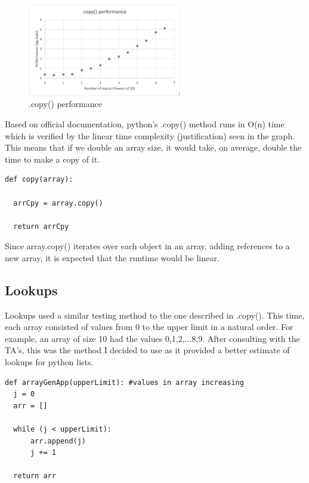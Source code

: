 \documentclass[12pt]{article}
\begin{document}
\begin{figure}[H]
\centering
\includegraphics[width=0.6\textwidth,height=\textheight,keepaspectratio]{copygraph.png}
\caption{.copy() performance}
\label{Figure: copygraph}
\end{figure}

Based on official documentation, python's .copy() method runs in O(n) time which is verified by the linear time complexity (justification) seen in the graph. This means that if we double an array size, it would take, on average, double the time to make a copy of it. 

\footnotesize
\begin{verbatim}
def copy(array):

  arrCpy = array.copy()

  return arrCpy
\end{verbatim}
\normalsize

Since array.copy() iterates over each object in an array, adding references to a new array, it is expected that the runtime would be linear.

\subsection{Lookups}

Lookups used a similar testing method to the one described in .copy(). This time, each array consisted of values from 0 to the upper limit in a natural order. For example, an array of size 10 had the values 0,1,2,...8,9. After consulting with the TA's, this was the method I decided to use as it provided a better estimate of lookups for python lists.

\footnotesize
\begin{verbatim}
def arrayGenApp(upperLimit): #values in array increasing
  j = 0
  arr = []
  
  while (j < upperLimit):
      arr.append(j)
      j += 1

  return arr
\end{verbatim}
\normalsize
\end{document}
